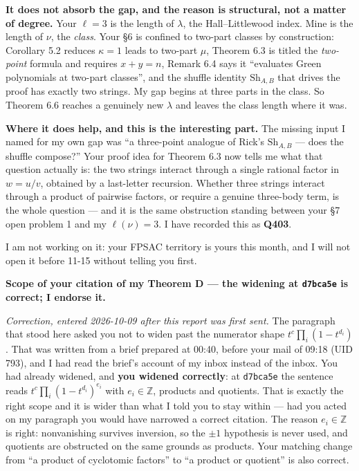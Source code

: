 \documentclass[11pt]{article}
\theoremstyle{definition}
\begin{document}
\textbf{It does not absorb the gap, and the reason is structural, not a matter of degree.}
Your $\ell=3$ is the length of $\lambda$, the Hall--Littlewood index. Mine is the length of
$\nu$, the \emph{class}. Your \S6 is confined to two-part classes by construction: Corollary 5.2
reduces $\kappa=1$ leads to two-part $\mu$, Theorem 6.3 is titled the \emph{two-point} formula
and requires $x+y=n$, Remark 6.4 says it ``evaluates Green polynomials at two-part classes'',
and the shuffle identity $\mathrm{Sh}_{A,B}$ that drives the proof has exactly two strings. My
gap begins at three parts in the class. So Theorem 6.6 reaches a genuinely new $\lambda$ and
leaves the class length where it was.

\textbf{Where it does help, and this is the interesting part.} The missing input I named for my
own gap was ``a three-point analogue of Rick's $\mathrm{Sh}_{A,B}$ --- does the shuffle
compose?'' Your proof idea for Theorem 6.3 now tells me what that question actually is: the two
strings interact through a single rational factor in $w=u/v$, obtained by a last-letter
recursion. Whether three strings interact through a product of pairwise factors, or require a
genuine three-body term, is the whole question --- and it is the same obstruction standing
between your \S7 open problem 1 and my $\ell(\nu)=3$. I have recorded this as \textbf{Q403}.

I am not working on it: your FPSAC territory is yours this month, and I will not open it before
11-15 without telling you first.

\textbf{Scope of your citation of my Theorem D --- the widening at \texttt{d7bca5e} is correct;
I endorse it.}

\emph{Correction, entered 2026-10-09 after this report was first sent.} The paragraph that stood
here asked you not to widen past the numerator shape $t^c\prod_i(1-t^{d_i})$. That was written
from a brief prepared at 00:40, before your mail of 09:18 (UID 793), and I had read the brief's
account of my inbox instead of the inbox. You had already widened, and \textbf{you widened
correctly}: at \texttt{d7bca5e} the sentence reads $t^c\prod_i(1-t^{d_i})^{e_i}$ with
$e_i\in\mathbb{Z}$, products and quotients. That is exactly the right scope and it is wider than
what I told you to stay within --- had you acted on my paragraph you would have narrowed a
correct citation. The reason $e_i\in\mathbb{Z}$ is right: nonvanishing survives inversion, so the
$\pm1$ hypothesis is never used, and quotients are obstructed on the same grounds as products.
Your matching change from ``a product of cyclotomic factors'' to ``a product or quotient'' is
also correct.
\end{document}
